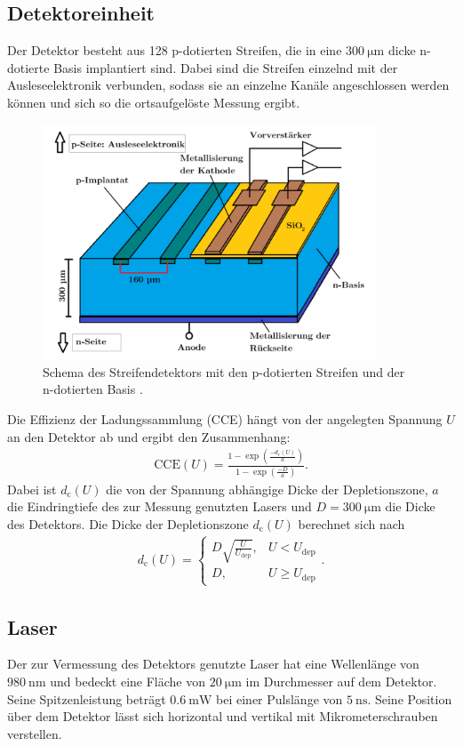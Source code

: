 \subsection{Detektoreinheit}
Der Detektor besteht aus 128 p-dotierten Streifen, die in eine $\SI{300}{\micro\meter}$ dicke n-dotierte Basis implantiert sind.
Dabei sind die Streifen einzelnd mit der Ausleseelektronik verbunden, sodass sie an einzelne Kanäle angeschlossen werden können und sich so die ortsaufgelöste Messung ergibt.
\begin{figure}
  \centering
  \includegraphics[height=7cm]{TimosAufrisse/detektorStreifen.png}
  \caption{Schema des Streifendetektors mit den p-dotierten Streifen und der n-dotierten Basis \cite{anleitung}.}
  \label{fig:detektorStreifen}
\end{figure}
Die Effizienz der Ladungssammlung (CCE) hängt von der angelegten Spannung $U$ an den Detektor ab und ergibt den Zusammenhang:
\begin{align}
  \text{CCE}(U) = \frac{1-\exp(\frac{-d_\text{c}(U)}{a})}{1-\exp(\frac{-D}{a})}.
  \label{eqn:cce}
\end{align}
Dabei ist $d_\text{c}(U)$ die von der Spannung abhängige Dicke der Depletionszone, $a$ die Eindringtiefe des zur Messung genutzten Lasers und $D = \SI{300}{\micro\meter}$ die Dicke des Detektors.
Die Dicke der Depletionszone $d_\text{c}(U)$ berechnet sich nach
\begin{align}
  d_\text{c}(U) =
  \begin{cases}
    D \sqrt{\frac{U}{U_\text{dep}}}, & U < U_\text{dep}\\
    D, & U \geq U_\text{dep}
  \end{cases}.
\end{align}

\subsection{Laser}
Der zur Vermessung des Detektors genutzte Laser hat eine Wellenlänge von $\SI{980}{\nano\meter}$ und bedeckt eine Fläche von $\SI{20}{\micro\meter}$ im Durchmesser auf dem Detektor. Seine Spitzenleistung beträgt $\SI{0.6}{\milli\watt}$ bei einer Pulslänge von $\SI{5}{\nano\second}$. Seine Position über dem Detektor lässt sich horizontal und vertikal mit Mikrometerschrauben verstellen.

